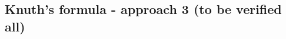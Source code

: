 \subsection{Knuth's formula - approach 3 (to be verified all)}\label{subsec:knuth's-formula---approach-3-(to-be-verified-all)}